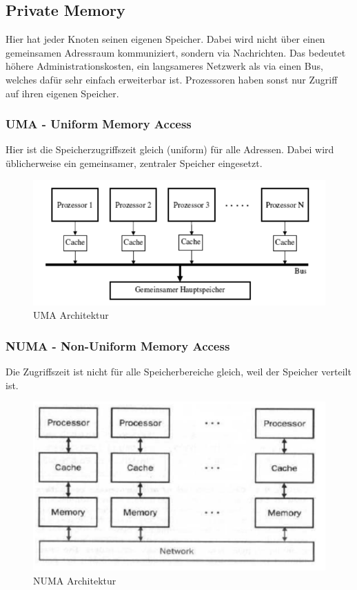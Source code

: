 \subsection{Private Memory}
Hier hat jeder Knoten seinen eigenen Speicher. Dabei wird nicht über einen gemeinsamen Adressraum kommuniziert, sondern via Nachrichten. Das bedeutet höhere Administrationskosten, ein langsameres Netzwerk als via einen Bus, welches dafür sehr einfach erweiterbar ist.
Prozessoren haben sonst nur Zugriff auf ihren eigenen Speicher.

\subsubsection{UMA - Uniform Memory Access}
Hier ist die Speicherzugriffszeit gleich (uniform) für alle Adressen. Dabei wird üblicherweise ein gemeinsamer, zentraler Speicher eingesetzt.
\begin{figure}
\centering
\includegraphics[width=0.7\linewidth]{fig/uma}
\caption{UMA Architektur}
\label{fig:uma}
\end{figure}

\subsubsection{NUMA - Non-Uniform Memory Access}
Die Zugriffszeit ist nicht für alle Speicherbereiche gleich, weil der Speicher verteilt ist.
\begin{figure}
\centering
\includegraphics[width=0.7\linewidth]{fig/numa}
\caption{NUMA Architektur}
\label{fig:numa}
\end{figure}


